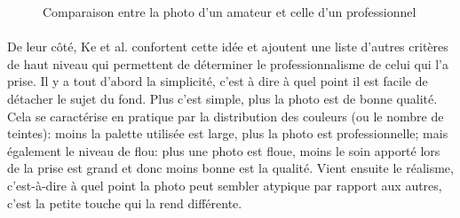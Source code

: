 \documentclass[11pt, french,screen]{report-rd-info}
\begin{document}
\begin{figure}[htp]
 \caption{Comparaison entre la photo d'un amateur et celle d'un professionnel \cite{Ke}}
 \label{fig:ComparaisonPhotosAmateurPro}
\end{figure}
\paragraph*{}
\label{crit:both}
De leur côté, Ke et al. \cite{Ke} confortent cette idée et ajoutent une liste d’autres critères de haut niveau qui permettent de déterminer le professionnalisme de celui qui l’a prise. Il y a tout d’abord la simplicité, c'est à dire à quel point il est facile de détacher le sujet du fond. Plus c'est simple, plus la photo est de bonne qualité. Cela se caractérise en pratique par la distribution des couleurs (ou le nombre de teintes): moins la palette utilisée est large, plus la photo est professionnelle; mais également le niveau de flou: plus une photo est floue, moins le soin apporté lors de la prise est grand et donc moins bonne est la qualité.
Vient ensuite le réalisme, c'est-à-dire à quel point la photo peut sembler atypique par rapport aux autres, c'est la petite touche qui la rend différente.
\end{document}
